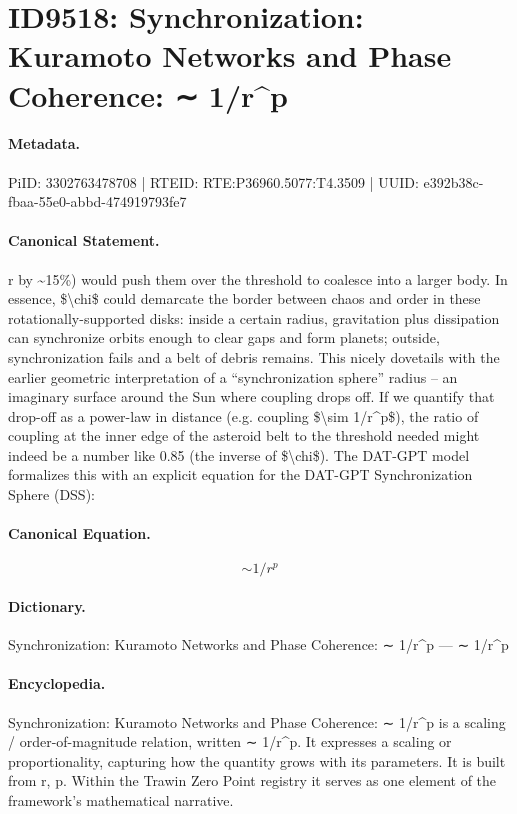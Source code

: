 \section*{ID9518: Synchronization: Kuramoto Networks and Phase Coherence: ∼ 1/r\textasciicircum{}p}
\paragraph{Metadata.}
PiID: 3302763478708 | RTEID: RTE:P36960.5077:T4.3509 | UUID: e392b38c-fbaa-55e0-abbd-474919793fe7

\paragraph{Canonical Statement.}
r by \textasciitilde{}15\%) would push them over the threshold to coalesce into a larger body. In essence, \$\textbackslash{}chi\$ could demarcate the border between chaos and order in these rotationally-supported disks: inside a certain radius, gravitation plus dissipation can synchronize orbits enough to clear gaps and form planets; outside, synchronization fails and a belt of debris remains. This nicely dovetails with the earlier geometric interpretation of a “synchronization sphere” radius – an imaginary surface around the Sun where coupling drops off. If we quantify that drop-off as a power-law in distance (e.g. coupling \$\textbackslash{}sim 1/r\textasciicircum{}p\$), the ratio of coupling at the inner edge of the asteroid belt to the threshold needed might indeed be a number like 0.85 (the inverse of \$\textbackslash{}chi\$). The DAT-GPT model formalizes this with an explicit equation for the DAT-GPT Synchronization Sphere (DSS):

\paragraph{Canonical Equation.}
\[
\sim 1/r^p
\]

\paragraph{Dictionary.}
Synchronization: Kuramoto Networks and Phase Coherence: ∼ 1/r\textasciicircum{}p — ∼ 1/r\textasciicircum{}p

\paragraph{Encyclopedia.}
Synchronization: Kuramoto Networks and Phase Coherence: ∼ 1/r\textasciicircum{}p is a scaling / order-of-magnitude relation, written ∼ 1/r\textasciicircum{}p. It expresses a scaling or proportionality, capturing how the quantity grows with its parameters. It is built from r, p. Within the Trawin Zero Point registry it serves as one element of the framework's mathematical narrative.
